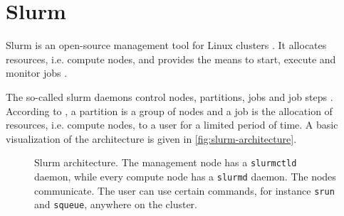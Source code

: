 
\section{Slurm}\label{subsec:slurm}

Slurm is an open-source management tool for Linux clusters \cite{slurm-online}.
It allocates resources, i.e. compute nodes, and provides the means to start, execute and monitor jobs \cite{slurm-online, slurm2003}.

The so-called slurm daemons control nodes, partitions, jobs and job steps \cite{slurm-online}.
According to \citeauthor{slurm-online}, a partition is a group of nodes and a job is the allocation of resources, i.e. compute nodes, to a user for a limited period of time.
A basic visualization of the architecture is given in \autoref{fig:slurm-architecture}.

\begin{figure}[htp] %
    \centering
    
    \caption{Slurm architecture. The management node has a \texttt{slurmctld} daemon, while every compute node has a \texttt{slurmd} daemon.
    The nodes communicate.
    The user can use certain commands, for instance \texttt{srun} and \texttt{squeue}, anywhere on the cluster.
    }
    \label{fig:slurm-architecture}
\end{figure}